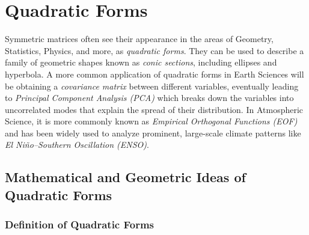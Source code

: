 \chapter{Quadratic Forms}

Symmetric matrices often see their appearance in the areas of Geometry, Statistics, Physics, and more, as \textit{quadratic forms}. They can be used to describe a family of geometric shapes known as \textit{conic sections}, including ellipses and hyperbola. A more common application of quadratic forms in Earth Sciences will be obtaining a \textit{covariance matrix} between different variables, eventually leading to \textit{Principal Component Analysis (PCA)} which breaks down the variables into uncorrelated modes that explain the spread of their distribution. In Atmospheric Science, it is more commonly known as \textit{Empirical Orthogonal Functions (EOF)} and has been widely used to analyze prominent, large-scale climate patterns like \textit{El Niño–Southern Oscillation (ENSO)}. 

\section{Mathematical and Geometric Ideas of Quadratic Forms}
\subsection{Definition of Quadratic Forms}

